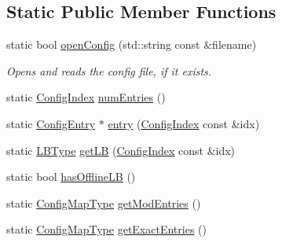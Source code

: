 \subsection*{Static Public Member Functions}
\begin{DoxyCompactItemize}
\item 
static bool \hyperlink{structvt_1_1vrt_1_1collection_1_1balance_1_1_read_l_b_config_a9fcbc87eb60d33c0e7d0cb363b8fdbb0}{open\+Config} (std\+::string const \&filename)
\begin{DoxyCompactList}\small\item\em Opens and reads the config file, if it exists. \end{DoxyCompactList}\item 
static \hyperlink{namespacevt_1_1vrt_1_1collection_1_1balance_ac1bb9eee8129549177880dbb4e5f6a34}{Config\+Index} \hyperlink{structvt_1_1vrt_1_1collection_1_1balance_1_1_read_l_b_config_aa16f51d2a1b0d3adc7ca6fa907231414}{num\+Entries} ()
\item 
static \hyperlink{structvt_1_1vrt_1_1collection_1_1balance_1_1_config_entry}{Config\+Entry} $\ast$ \hyperlink{structvt_1_1vrt_1_1collection_1_1balance_1_1_read_l_b_config_a2811ea4fc680cc4dfe94d8c9160f7514}{entry} (\hyperlink{namespacevt_1_1vrt_1_1collection_1_1balance_ac1bb9eee8129549177880dbb4e5f6a34}{Config\+Index} const \&idx)
\item 
static \hyperlink{namespacevt_1_1vrt_1_1collection_1_1balance_ac4f99693509affcc67db182d4aad9b5c}{L\+B\+Type} \hyperlink{structvt_1_1vrt_1_1collection_1_1balance_1_1_read_l_b_config_ad1cf6d87a102700f5f0546265f31de8e}{get\+LB} (\hyperlink{namespacevt_1_1vrt_1_1collection_1_1balance_ac1bb9eee8129549177880dbb4e5f6a34}{Config\+Index} const \&idx)
\item 
static bool \hyperlink{structvt_1_1vrt_1_1collection_1_1balance_1_1_read_l_b_config_a114f13e0fbfb08fe3e3de3f7e7fc9a84}{has\+Offline\+LB} ()
\item 
static \hyperlink{structvt_1_1vrt_1_1collection_1_1balance_1_1_read_l_b_config_ad7babe539cf2171b9a9cee642b36a965}{Config\+Map\+Type} \hyperlink{structvt_1_1vrt_1_1collection_1_1balance_1_1_read_l_b_config_ae7041ee267d22fe1fa9c7518f9d3eb98}{get\+Mod\+Entries} ()
\item 
static \hyperlink{structvt_1_1vrt_1_1collection_1_1balance_1_1_read_l_b_config_ad7babe539cf2171b9a9cee642b36a965}{Config\+Map\+Type} \hyperlink{structvt_1_1vrt_1_1collection_1_1balance_1_1_read_l_b_config_a5e32057d53bfad17ba659a57b810c559}{get\+Exact\+Entries} ()
\item 

\end{DoxyCompactItemize}
